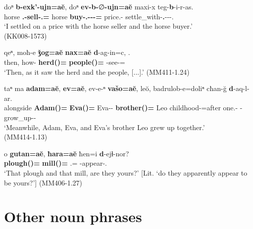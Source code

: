 \begin{exe}
	\ex\label{complexnp-ex08}
	\begin{xlist}
		\ex\label{complexnp-ex08a}
		\gll doⁿ \textbf{b-exk'-ujn=a\u{e}}, doⁿ \textbf{ev-b-}∅\textbf{-ujn=a\u{e}} maxi-x teg-\textbf{b}-i-r-as. \\
		horse \textbf{{\B}.{\Sg}-sell-{\Ptcp}.{\Npst}={\Add}} horse \textbf{buy-{\B}.{\Sg}-{\Tr}-{\Ptcp}-{\Aor}={\Add}} price.{\Obl}-{\Cont} settle\_with-\textbf{{\M}.{\Pl}}-{\Tr}-{\Imprf}-{\Fsg}.{\Erg} \\
		\trans `I settled on a price with the horse seller and the horse buyer.' \\
		\hfill (KK008-1573)
		
		\ex\label{complexnp-ex08b}
		\gll qeⁿ, moħ-e \textbf{ǯog=a\u{e}} \textbf{nax=a\u{e}} \textbf{d}-ag-in=c, {\normalfont[...].} \\
		then, how-{\Rel} \textbf{herd({\J})={\Add}} \textbf{people({\D})={\Add}} \textbf{{\D}}-see-{\Aor}={\Subord} \\
		\trans `Then, as it saw the herd and the people, [...].'
		\hfill (MM411-1.24)
		
		\ex\label{complexnp-ex08c}
		\gll taⁿ ma \textbf{adam=a\u{e}}, \textbf{ev=a\u{e}}, ev-e-ⁿ \textbf{vašo=a\u{e}}, le\u{o}, badrulob-e=doliⁿ cħan-\u{g} \textbf{d}-aq-l-ar. \\
		alongside {\Contr} \textbf{Adam({\M})={\Add}} \textbf{Eva({\F})={\Add}} Eva-{\Obl}-{\Gen} \textbf{brother({\M})={\Add}} Leo childhood-{\Obl}=after one.{\Obl}-{\Trans} \textbf{{\D}}-grow\_up-{\Intr}-{\Imprf} \\
		\trans `Meanwhile, Adam, Eva, and Eva's brother Leo grew up together.' \\
		\hfill (MM414-1.13)
		
		\ex\label{complexnp-ex08d}
		\gll o \textbf{gutan=a\u{e}}, \textbf{ħara=a\u{e}} ħen=i \textbf{d}-ejɬ-nor? \\
		{\Dist} \textbf{plough({\J})={\Add}} \textbf{mill({\J})={\Add}} {\Ssg}.{\Gen}={\Q} \textbf{{\D}}-appear-{\Nw}.{\Rem} \\
		\trans `That plough and that mill, are they yours?' [Lit. `do they apparently appear to be yours?'] 
		\hfill (MM406-1.27)
		
		
		
	\end{xlist}
\end{exe}




\section{Other noun phrases} \label{headlessnp}

